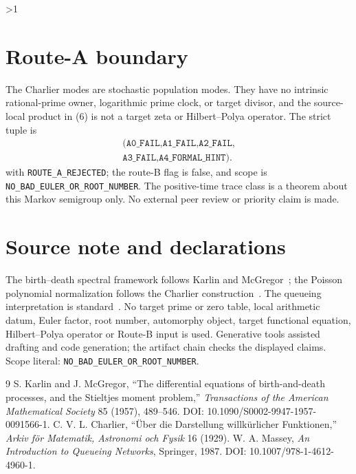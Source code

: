 \documentclass[11pt]{article}
\begin{document}
\ifnum\CRevisionRound>1
\section{Route-A boundary}
The Charlier modes are stochastic population modes.  They have no intrinsic
rational-prime owner, logarithmic prime clock, or target divisor, and the
source-local product in (6) is not a target zeta or Hilbert--Polya operator.
The strict tuple is
\[
 \begin{gathered}
 (\texttt{A0\_FAIL,A1\_FAIL,A2\_FAIL,}\\[-1mm]
 \texttt{A3\_FAIL,A4\_FORMAL\_HINT}) .
 \end{gathered}
\]
with \texttt{ROUTE\_A\_REJECTED}; the route-B flag is false, and scope is
\texttt{NO\_BAD\_EULER\_OR\_ROOT\_NUMBER}.  The positive-time
trace class is a theorem about this Markov semigroup only.  No external peer
review or priority claim is made.
\fi

\section*{Source note and declarations}
The birth--death spectral framework follows Karlin and McGregor~\cite{KM1957};
the Poisson polynomial normalization follows the Charlier construction~\cite{Ch1929}.
The queueing interpretation is standard~\cite{Massey1987}.  No target prime or
zero table, local arithmetic datum, Euler factor, root number, automorphy
object, target functional equation, Hilbert--Polya operator or Route-B input is
used.  Generative tools assisted drafting and code generation; the artifact
chain checks the displayed claims.  Scope literal:
\texttt{NO\_BAD\_EULER\_OR\_ROOT\_NUMBER}.

\begin{thebibliography}{9}
 S. Karlin and J. McGregor, ``The differential equations of
birth-and-death processes, and the Stieltjes moment problem,''
\emph{Transactions of the American Mathematical Society} 85 (1957), 489--546.
DOI: 10.1090/S0002-9947-1957-0091566-1.
 C. V. L. Charlier, ``Über die Darstellung willkürlicher
Funktionen,'' \emph{Arkiv för Matematik, Astronomi och Fysik} 16 (1929).
 W. A. Massey, \emph{An Introduction to Queueing Networks},
Springer, 1987. DOI: 10.1007/978-1-4612-4960-1.
\end{thebibliography}
\end{document}
